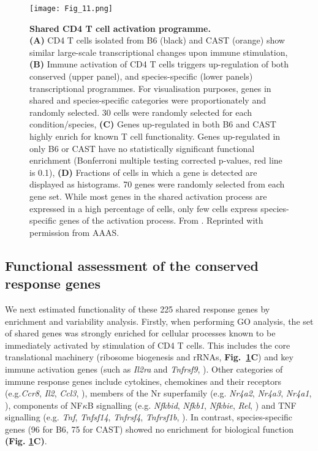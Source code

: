 \begin{figure}[!ht]
\centering
\texttt{[image: Fig\_11.png]}
\caption[Shared CD4\plus{} T cell activation programme]{\textbf{Shared CD4\plus{} T cell activation programme.}\\
\textbf{(A)} CD4\plus{} T cells isolated from B6 (black) and CAST (orange) show similar large-scale transcriptional changes upon immune stimulation, 
\textbf{(B)} Immune activation of CD4\plus{} T cells triggers up-regulation of both conserved (upper panel), and species-specific (lower panels) transcriptional programmes. 
For visualisation purposes, genes in shared and species-specific categories were proportionately and randomly selected. 30 cells were randomly selected for each condition/species, 
\textbf{(C)} Genes up-regulated in both B6 and CAST highly enrich for known T cell functionality. Genes up-regulated in only B6 or CAST have no statistically significant functional enrichment (Bonferroni multiple testing corrected p-values, red line is 0.1), 
\textbf{(D)} Fractions of cells in which a gene is detected are displayed as histograms. 70 genes were randomly selected from each gene set. While most genes in the shared activation process are expressed in a high percentage of cells, only few cells express species-specific genes of the activation process. 
From \citep{Martinez-jimenez2017}. 
Reprinted with permission from AAAS.}
\label{fig1:shared_activation}
\end{figure}

\newpage

\subsection{Functional assessment of the conserved response genes}

We next estimated functionality of these 225 shared response genes by enrichment and variability analysis. 
Firstly, when performing GO analysis, the set of shared genes was strongly enriched for cellular processes known to be immediately activated by stimulation of CD4\plus{} T cells. 
This includes the core translational machinery (ribosome biogenesis and \glspl{rRNA}, \textbf{Fig.~\ref{fig1:shared_activation}C}) and key immune activation genes (such as \textit{Il2ra} and \textit{Tnfrsf9}, \citep{Asmal2003}). 
Other categories of immune response genes include cytokines, chemokines and their receptors (e.g.\textit{Ccr8}, \textit{Il2}, \textit{Ccl3}, \citep{Turner2014}), members of the \gls{Nr} superfamily (e.g. \textit{Nr4a2}, \textit{Nr4a3}, \textit{Nr4a1}, \citep{Glass2010}), components of NF$\kappa$B signalling (e.g. \textit{Nfkbid}, \textit{Nfkb1}, \textit{Nfkbie}, \textit{Rel}, \citep{Gerondakis2010}) and \gls{TNF} signalling (e.g. \textit{Tnf}, \textit{Tnfsf14}, \textit{Tnfrsf4}, \textit{Tnfrsf1b}, \citep{Croft2009}). 
In contrast, species-specific genes (96 for B6, 75 for CAST) showed no enrichment for biological function \textbf{(Fig. \ref{fig1:shared_activation}C)}. \\

